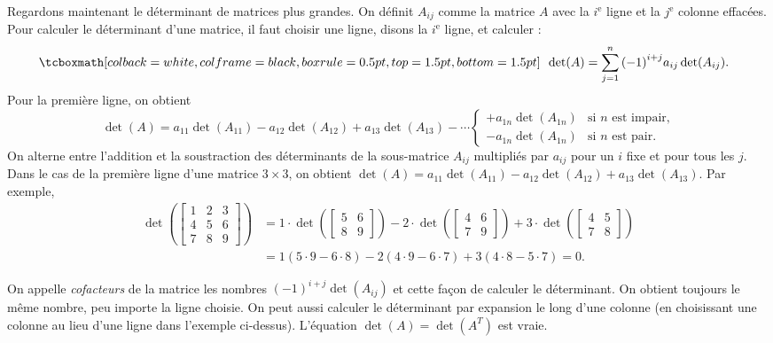 Regardons maintenant le déterminant de matrices plus grandes. On définit $A_{ij}$ comme la matrice $A$ avec la $i^{\text{e}}$ ligne et la $j^{\text{e}}$ colonne effacées. Pour calculer le déterminant d'une matrice, il faut choisir une ligne, disons la
$i^{\text{e}}$ ligne, et calculer :
\begin{equation*}
\mybxbg{~~
\det (A) =
\sum_{j=1}^n
{(-1)}^{i+j}
a_{ij} \det (A_{ij}) .
~~}
\end{equation*}
Pour la première ligne, on obtient
\begin{equation*}
\det (A) =
a_{11} \det (A_{11}) - 
a_{12} \det (A_{12}) + 
a_{13} \det (A_{13}) - 
\cdots
\begin{cases}
+ a_{1n} \det (A_{1n}) & \text{si } n \text{ est impair,} \\
- a_{1n} \det (A_{1n}) & \text{si } n \text{ est pair.}
\end{cases}
\end{equation*}
On alterne entre l'addition et la soustraction des déterminants de la sous-matrice 
$A_{ij}$ multipliés par $a_{ij}$ pour un $i$ fixe et pour tous les $j$.
Dans le cas de la première ligne d'une matrice $3 \times 3$,
on obtient $\det (A) = a_{11} \det (A_{11}) -
a_{12} \det (A_{12}) + a_{13} \det (A_{13})$. Par exemple,
\begin{equation*}
\begin{split}
\det \left(
\begin{bmatrix}
1 & 2 & 3 \\
4 & 5 & 6 \\
7 & 8 & 9
\end{bmatrix}
\right)
& =
1 \cdot
\det \left(
\begin{bmatrix}
5 & 6 \\
8 & 9
\end{bmatrix}
\right)
-
2 \cdot
\det \left(
\begin{bmatrix}
4 & 6 \\
7 & 9
\end{bmatrix}
\right)
+
3 \cdot
\det \left(
\begin{bmatrix}
4 & 5 \\
7 & 8
\end{bmatrix}
\right) \\
& =
1 (5 \cdot 9 - 6 \cdot 8)
-
2 (4 \cdot 9 - 6 \cdot 7)
+
3 (4 \cdot 8 - 5 \cdot 7)
= 0 .
\end{split}
\end{equation*}

On appelle \emph{cofacteurs} de la matrice les nombres ${(-1)}^{i+j}\det(A_{ij})$ et
\emph{} cette façon de calculer le déterminant.
On obtient toujours le même nombre, peu importe la ligne choisie. On peut aussi calculer le déterminant par expansion le long d'une colonne (en choisissant une colonne au lieu d'une ligne dans l'exemple ci-dessus). L'équation $\det(A) = \det(A^T)$ est vraie.

